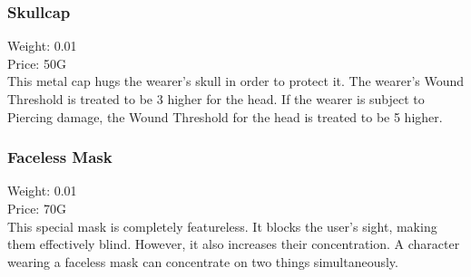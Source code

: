\subsubsection{Skullcap}
Weight: 0.01\\
Price: 50G\\
This metal cap hugs the wearer's skull in order to protect it. The wearer's Wound Threshold is treated to be 3 higher for the head. If the wearer is subject to Piercing damage, the Wound Threshold for the head is treated to be 5 higher.\\

\subsubsection{Faceless Mask}
Weight: 0.01\\
Price: 70G\\
This special mask is completely featureless. It blocks the user's sight, making them effectively blind. However, it also increases their concentration. A character wearing a faceless mask can concentrate on two things simultaneously.\\